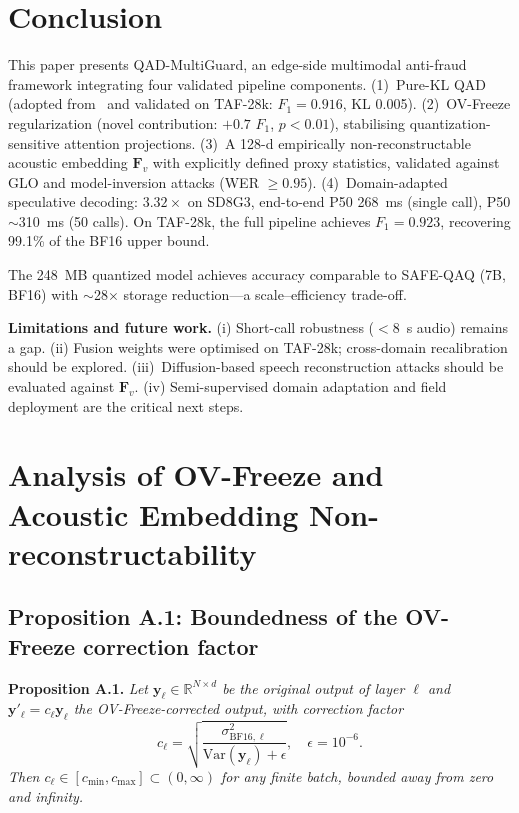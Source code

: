 \documentclass[lettersize,journal]{IEEEtran}
\begin{document}
\section{Conclusion}
\label{sec:conclusion}

This paper presents QAD-MultiGuard, an edge-side multimodal anti-fraud
framework integrating four validated pipeline components.
(1)~Pure-KL QAD (adopted from~\cite{3} and validated on TAF-28k:
$F_1=0.916$, KL 0.005).
(2)~OV-Freeze regularization (novel contribution: $+0.7$ $F_1$,
$p<0.01$), stabilising quantization-sensitive attention projections.
(3)~A 128-d empirically non-reconstructable acoustic embedding
$\bm{F}_v$ with explicitly defined proxy statistics, validated
against GLO and model-inversion attacks (WER $\ge 0.95$).
(4)~Domain-adapted speculative decoding: $3.32\times$ on SD8G3,
end-to-end P50 268~ms (single call), P50 $\sim$310~ms (50 calls).
On TAF-28k, the full pipeline achieves $F_1=0.923$, recovering
99.1\% of the BF16 upper bound.

The 248~MB quantized model achieves accuracy comparable to SAFE-QAQ
(7B, BF16) with $\sim$28$\times$ storage reduction---a
scale--efficiency trade-off.

\textbf{Limitations and future work.}  (i) Short-call robustness
($<8$~s audio) remains a gap.  (ii) Fusion weights were optimised on
TAF-28k; cross-domain recalibration should be explored.
(iii)~Diffusion-based speech reconstruction attacks should be
evaluated against $\bm{F}_v$.  (iv) Semi-supervised domain
adaptation and field deployment are the critical next steps.

\appendix
\section{Analysis of OV-Freeze and Acoustic Embedding Non-reconstructability}

\subsection{Proposition A.1: Boundedness of the OV-Freeze
correction factor}

\textbf{Proposition A.1.}  \emph{Let $\bm{y}_\ell\in\mathbb{R}^{N\times d}$
be the original output of layer $\ell$ and $\bm{y}'_\ell = c_\ell
\bm{y}_\ell$ the OV-Freeze-corrected output, with correction factor}
\[
  c_\ell = \sqrt{\frac{\sigma^2_{\mathrm{BF16},\ell}}
                      {\mathrm{Var}(\bm{y}_\ell)+\epsilon}},
  \quad \epsilon=10^{-6}.
\]
\emph{Then $c_\ell \in [c_{\min}, c_{\max}] \subset (0,\infty)$
for any finite batch, bounded away from zero and infinity.}
\end{document}
